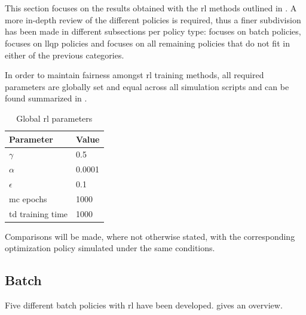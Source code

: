 \documentclass{seal_thesis}
\begin{document}
\clearpage

\section{}
\label{sec:rl_results}

This section focuses on the results obtained with the \gls{rl} methods outlined in . A more in-depth review of the different policies is required, thus a finer subdivision has been made in different subsections per policy type:  focuses on batch policies,  focuses on \gls{llqp} policies and  focuses on all remaining policies that do not fit in either of the previous categories.

In order to maintain fairness amongst \gls{rl} training methods, all required parameters are globally set and equal across all simulation scripts and can be found summarized in .

\begin{table}[!ht]
\centering
\begin{tabular}{@{}ll@{}}
\toprule
Parameter        & Value  \\ \midrule
$\gamma$            & 0.5    \\
$\alpha$            & 0.0001 \\
$\epsilon$          & 0.1    \\
\gls{mc} epochs        & 1000   \\
\gls{td} training time & 1000   \\ \bottomrule
\end{tabular}
\caption{Global \gls{rl} parameters}
\label{tab:global_rl_params}
\end{table}

Comparisons will be made, where not otherwise stated, with the corresponding optimization policy simulated under the same conditions.

\subsection{Batch}
\label{subsec:rl_batch}

Five different batch policies with \gls{rl} have been developed.  gives an overview.
\end{document}
